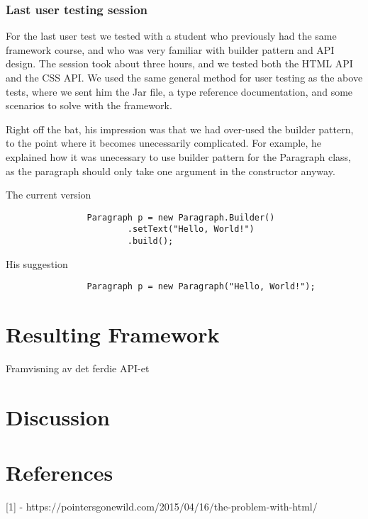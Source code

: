 \documentclass[12pt]{article}
\begin{document}
        \subsubsection{Last user testing session}
        For the last user test we tested with a student who previously had the same framework course, and who was very familiar with builder pattern and API design. The session took about three hours, and we tested both the HTML API and the CSS API. We used the same general method for user testing as the above tests, where we sent him the Jar file, a type reference documentation, and some scenarios to solve with the framework.

        Right off the bat, his impression was that we had over-used the builder pattern, to the point where it becomes unecessarily complicated. For example, he explained how it was unecessary to use builder pattern for the Paragraph class, as the paragraph should only take one argument in the constructor anyway.

        \begin{shaded}
            The current version

            \begin{lstlisting}
                Paragraph p = new Paragraph.Builder()
                        .setText("Hello, World!")
                        .build();
            \end{lstlisting}

            His suggestion

            \begin{lstlisting}
                Paragraph p = new Paragraph("Hello, World!");
            \end{lstlisting}
        \end{shaded}
        

\section{Resulting Framework}
Framvisning av det ferdie API-et

\section{Discussion}

\section{References}
[1] - https://pointersgonewild.com/2015/04/16/the-problem-with-html/
\end{document}

